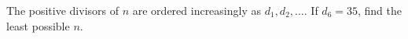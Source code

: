 The positive divisors of $n$ are ordered increasingly as $d_1,d_2,\ldots$. If $d_6=35$, find the least possible $n$.
